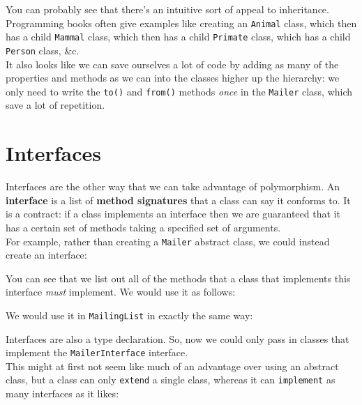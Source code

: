 You can probably see that there's an intuitive sort of appeal to inheritance. Programming books often give examples like creating an \texttt{Animal} class, which then has a child \texttt{Mammal} class, which then has a child \texttt{Primate} class, which has a child \texttt{Person} class, \&c.
\\

It also looks like we can save ourselves a lot of code by adding as many of the properties and methods as we can into the classes higher up the hierarchy: we only need to write the \texttt{to()} and \texttt{from()} methods \textit{once} in the \texttt{Mailer} class, which save a lot of repetition.





\section{Interfaces}

Interfaces are the other way that we can take advantage of polymorphism. An \textbf{interface} is a list of \textbf{method signatures} that a class can say it conforms to. It is a contract: if a class implements an interface then we are guaranteed that it has a certain set of methods taking a specified set of arguments.
\\

For example, rather than creating a \texttt{Mailer} abstract class, we could instead create an interface:


You can see that we list out all of the methods that a class that implements this interface \textit{must} implement. We would use it as follows:


We would use it in \texttt{MailingList} in exactly the same way:


Interfaces are also a type declaration. So, now we could only pass in classes that implement the \texttt{MailerInterface} interface.
\\

This might at first not seem like much of an advantage over using an abstract class, but a class can only \texttt{extend} a single class, whereas it can \texttt{implement} as many interfaces as it likes:

